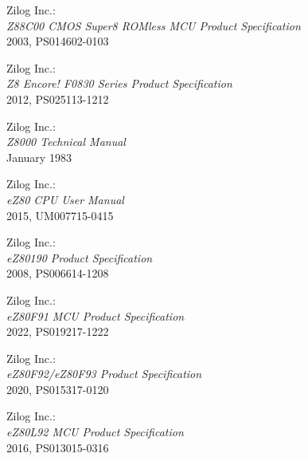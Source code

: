  Zilog Inc.: \\
               {\em Z88C00 CMOS Super8 ROMless MCU Product Specification\/} \\
               2003, PS014602-0103

 Zilog Inc.: \\
               {\em Z8 Encore! F0830 Series Product Specification\/} \\
               2012, PS025113-1212

 Zilog Inc.: \\
               {\em Z8000 Technical Manual\/} \\
               January 1983

 Zilog Inc.: \\
               {\em eZ80 CPU User Manual\/} \\
               2015, UM007715-0415

 Zilog Inc.: \\
               {\em eZ80190 Product Specification\/} \\
               2008, PS006614-1208

 Zilog Inc.: \\
               {\em eZ80F91 MCU Product Specification\/} \\
               2022, PS019217-1222

 Zilog Inc.: \\
               {\em eZ80F92/eZ80F93 Product Specification\/} \\
               2020, PS015317-0120

 Zilog Inc.: \\
               {\em eZ80L92 MCU Product Specification\/} \\
               2016, PS013015-0316

